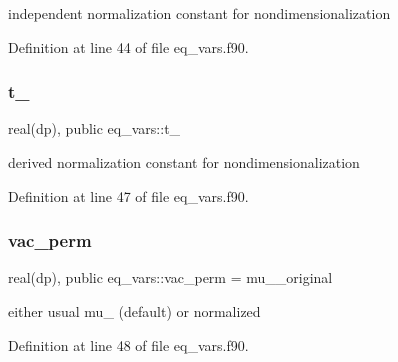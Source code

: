 independent normalization constant for nondimensionalization 



Definition at line 44 of file eq\+\_\+vars.\+f90.

\mbox{\label{namespaceeq__vars_a5170d0b84bb0faf24d5fdcf7c9371620}} 
\subsubsection{\texorpdfstring{t\+\_}{t\_0}}
{\footnotesize\ttfamily real(dp), public eq\+\_\+vars\+::t\+\_}



derived normalization constant for nondimensionalization 



Definition at line 47 of file eq\+\_\+vars.\+f90.

\mbox{\label{namespaceeq__vars_ac45a3781896236d8c8fe95d920f7337c}} 
\subsubsection{\texorpdfstring{vac\+\_\+perm}{vac\_perm}}
{\footnotesize\ttfamily real(dp), public eq\+\_\+vars\+::vac\+\_\+perm = mu\+\_\+\_\+original}



either usual mu\+\_ (default) or normalized 



Definition at line 48 of file eq\+\_\+vars.\+f90.

